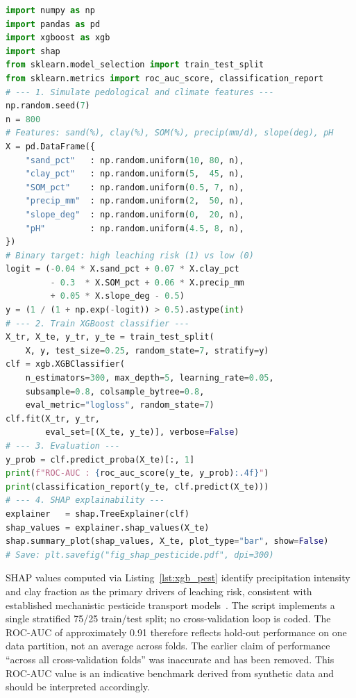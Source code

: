 \documentclass[environremediat,article,accept,pdftex,oneauthor]{Definitions/mdpi}
\begin{document}
\begin{lstlisting}[language=Python,basicstyle=\scriptsize\ttfamily,
    caption={Python %MDPI: Please check and confirm if * should be revised to multiplication sign.
% AUTHOR: The asterisk is the Python multiplication operator within the code and is correct as written; it should not be revised to a multiplication sign.
 workflow: XGBoost gradient boosting with SHAP
             explainability for pesticide leaching risk prediction
             (Script~2).\vspace{4pt}},
    label={lst:xgb_pest},xleftmargin=12pt,xrightmargin=3.5pt]
import numpy as np
import pandas as pd
import xgboost as xgb
import shap
from sklearn.model_selection import train_test_split
from sklearn.metrics import roc_auc_score, classification_report
# --- 1. Simulate pedological and climate features ---
np.random.seed(7)
n = 800
# Features: sand(%), clay(%), SOM(%), precip(mm/d), slope(deg), pH
X = pd.DataFrame({
    "sand_pct"   : np.random.uniform(10, 80, n),
    "clay_pct"   : np.random.uniform(5,  45, n),
    "SOM_pct"    : np.random.uniform(0.5, 7, n),
    "precip_mm"  : np.random.uniform(2,  50, n),
    "slope_deg"  : np.random.uniform(0,  20, n),
    "pH"         : np.random.uniform(4.5, 8, n),
})
# Binary target: high leaching risk (1) vs low (0)
logit = (-0.04 * X.sand_pct + 0.07 * X.clay_pct
         - 0.3  * X.SOM_pct + 0.06 * X.precip_mm
         + 0.05 * X.slope_deg - 0.5)
y = (1 / (1 + np.exp(-logit)) > 0.5).astype(int)
# --- 2. Train XGBoost classifier ---
X_tr, X_te, y_tr, y_te = train_test_split(
    X, y, test_size=0.25, random_state=7, stratify=y)
clf = xgb.XGBClassifier(
    n_estimators=300, max_depth=5, learning_rate=0.05,
    subsample=0.8, colsample_bytree=0.8,
    eval_metric="logloss", random_state=7)
clf.fit(X_tr, y_tr,
        eval_set=[(X_te, y_te)], verbose=False)
# --- 3. Evaluation ---
y_prob = clf.predict_proba(X_te)[:, 1]
print(f"ROC-AUC : {roc_auc_score(y_te, y_prob):.4f}")
print(classification_report(y_te, clf.predict(X_te)))
# --- 4. SHAP explainability ---
explainer   = shap.TreeExplainer(clf)
shap_values = explainer.shap_values(X_te)
shap.summary_plot(shap_values, X_te, plot_type="bar", show=False)
# Save: plt.savefig("fig_shap_pesticide.pdf", dpi=300)
\end{lstlisting}

{SHAP values computed via Listing~\ref{lst:xgb_pest} identify precipitation intensity and clay fraction as the primary drivers of leaching risk, consistent with established mechanistic pesticide transport models~\cite{PerezLucas2025,Marcelino2024}. The script implements a single stratified 75/25 train/test split; no cross-validation loop is coded. The ROC-AUC of approximately 0.91 therefore reflects hold-out performance on one data partition, not an average across folds. The earlier claim of performance ``across all cross-validation folds'' was inaccurate and has been removed. This ROC-AUC value is an indicative benchmark derived from synthetic data and should be interpreted accordingly.}
\end{document}
